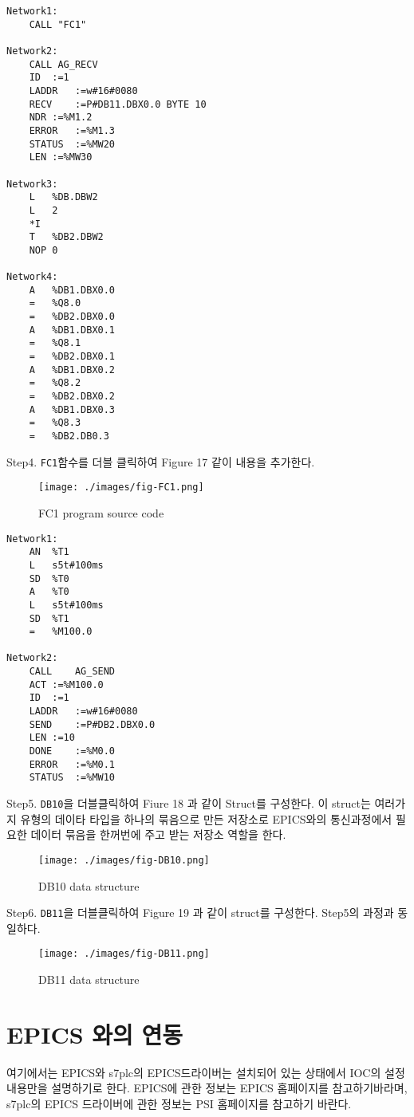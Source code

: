 \documentclass[11pt
  , a4paper
  , article
  , oneside
]{memoir}
\begin{document}
\begin{lstlisting}[style=termstyle]
Network1:
	CALL "FC1"

Network2:
	CALL AG_RECV
	ID	:=1
	LADDR	:=w#16#0080
	RECV	:=P#DB11.DBX0.0 BYTE 10
	NDR	:=%M1.2
	ERROR	:=%M1.3
	STATUS	:=%MW20
	LEN	:=%MW30

Network3:
	L	%DB.DBW2
	L	2
	*I
	T	%DB2.DBW2
	NOP	0

Network4:
	A	%DB1.DBX0.0
	=	%Q8.0
	=	%DB2.DBX0.0
	A	%DB1.DBX0.1
	=	%Q8.1
	=	%DB2.DBX0.1
	A	%DB1.DBX0.2
	=	%Q8.2
	=	%DB2.DBX0.2
	A	%DB1.DBX0.3
	=	%Q8.3
	=	%DB2.DB0.3
\end{lstlisting}
Step4. \verb|FC1|함수를 더블 클릭하여 Figure 17 같이 내용을 추가한다.\\
\begin{figure}[!htb]
  \centering
  \texttt{[image: ./images/fig-FC1.png]}
  \caption{FC1 program source code}
  \label{}
\end{figure}
\begin{lstlisting}[style=termstyle]
Network1:
	AN	%T1
	L	s5t#100ms
	SD	%T0
	A	%T0
	L	s5t#100ms
	SD	%T1
	=	%M100.0

Network2:
	CALL	AG_SEND
	ACT	:=%M100.0
	ID	:=1
	LADDR	:=w#16#0080
	SEND	:=P#DB2.DBX0.0
	LEN	:=10
	DONE	:=%M0.0
	ERROR	:=%M0.1
	STATUS	:=%MW10
\end{lstlisting}
Step5. \verb|DB10|을 더블클릭하여 Fiure 18 과 같이 Struct를 구성한다. 이 struct는 여러가지 유형의 데이타 타입을 하나의 묶음으로 만든 저장소로 EPICS와의 통신과정에서 필요한 데이터 묶음을 한꺼번에 주고 받는 저장소 역할을 한다.\\
\begin{figure}[!htb]
  \centering
  \texttt{[image: ./images/fig-DB10.png]}
  \caption{DB10 data structure}
  \label{}
\end{figure}
\newline Step6. \verb|DB11|을 더블클릭하여 Figure 19 과 같이 struct를 구성한다. Step5의 과정과 동일하다.\\
\begin{figure}[!htb]
  \centering
  \texttt{[image: ./images/fig-DB11.png]}
  \caption{DB11 data structure}
  \label{}
\end{figure}

\chapter{EPICS 와의 연동}
여기에서는 EPICS와 s7plc의 EPICS드라이버는 설치되어 있는 상태에서 IOC의 설정 내용만을 설명하기로 한다.
EPICS에 관한 정보는 EPICS 홈페이지를 참고하기바라며, s7plc의 EPICS 드라이버에 관한 정보는 PSI 홈페이지를 참고하기 바란다.
\end{document}
